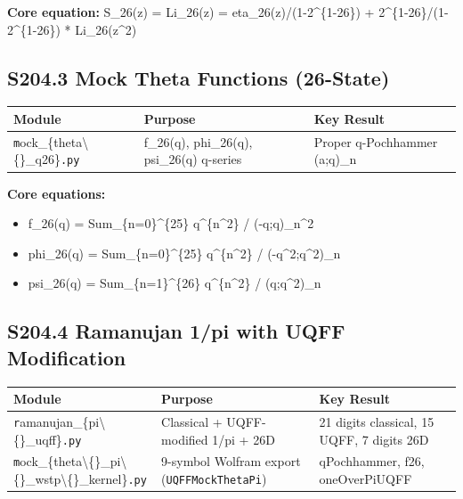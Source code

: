 \documentclass[11pt]{article}
\begin{document}
\textbf{Core equation:} S\_26(z) = Li\_26(z) = eta\_26(z)/(1-2\textasciicircum{}\{1-26\}) + 2\textasciicircum{}\{1-26\}/(1-2\textasciicircum{}\{1-26\}) * Li\_26(z\textasciicircum{}2)

\subsection*{S204.3 Mock Theta Functions (26-State)}

\begin{center}
\begin{longtable}{lll}
\toprule
Module & Purpose & Key Result \tabularnewline
\midrule
\endhead
\verb|m|ock\_\{theta\textbackslash\{\}\_q26\}\verb|.py| & f\_26(q), phi\_26(q), psi\_26(q) q-series & Proper q-Pochhammer (a;q)\_n \tabularnewline
\bottomrule
\end{longtable}
\end{center}

\textbf{Core equations:}

\begin{itemize}
  \item f\_26(q) = Sum\_\{n=0\}\textasciicircum{}\{25\} q\textasciicircum{}\{n\textasciicircum{}2\} / (-q;q)\_n\textasciicircum{}2
  \item phi\_26(q) = Sum\_\{n=0\}\textasciicircum{}\{25\} q\textasciicircum{}\{n\textasciicircum{}2\} / (-q\textasciicircum{}2;q\textasciicircum{}2)\_n
  \item psi\_26(q) = Sum\_\{n=1\}\textasciicircum{}\{26\} q\textasciicircum{}\{n\textasciicircum{}2\} / (q;q\textasciicircum{}2)\_n
\end{itemize}

\subsection*{S204.4 Ramanujan 1/pi with UQFF Modification}

\begin{center}
\begin{longtable}{lll}
\toprule
Module & Purpose & Key Result \tabularnewline
\midrule
\endhead
\verb|r|amanujan\_\{pi\textbackslash\{\}\_uqff\}\verb|.py| & Classical + UQFF-modified 1/pi + 26D & 21 digits classical, 15 UQFF, 7 digits 26D \tabularnewline
\verb|m|ock\_\{theta\textbackslash\{\}\_pi\textbackslash\{\}\_wstp\textbackslash\{\}\_kernel\}\verb|.py| & 9-symbol Wolfram export (\verb|UQFFMockThetaPi|) & qPochhammer, f26, oneOverPiUQFF \tabularnewline
\bottomrule
\end{longtable}
\end{center}
\end{document}
